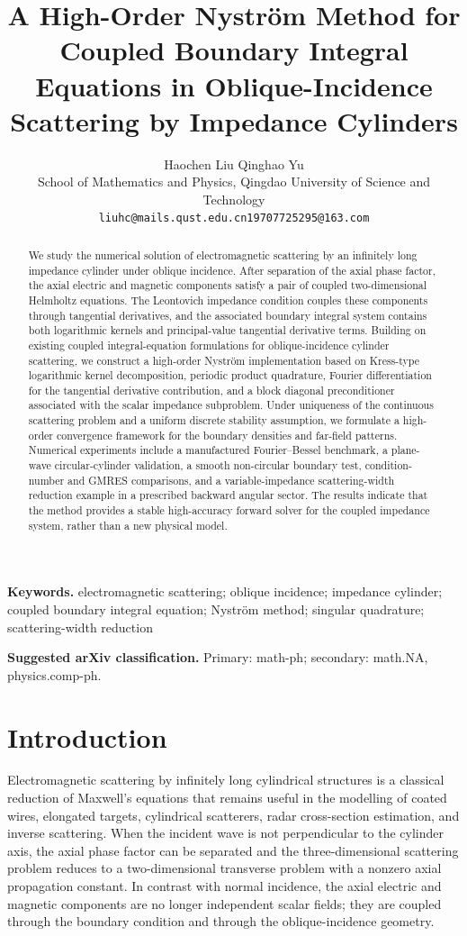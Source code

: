 \documentclass[11pt]{article}
\title{A High-Order Nystr\"om Method for Coupled Boundary Integral Equations in Oblique-Incidence Scattering by Impedance Cylinders}
\author{
Haochen Liu \quad Qinghao Yu\\
School of Mathematics and Physics, Qingdao University of Science and Technology\\
\texttt{liuhc@mails.qust.edu.cn}\quad \texttt{19707725295@163.com}
}
\date{}
\numberwithin{equation}{section}
\begin{document}
\maketitle

\begin{abstract}
We study the numerical solution of electromagnetic scattering by an infinitely long impedance cylinder under oblique incidence. After separation of the axial phase factor, the axial electric and magnetic components satisfy a pair of coupled two-dimensional Helmholtz equations. The Leontovich impedance condition couples these components through tangential derivatives, and the associated boundary integral system contains both logarithmic kernels and principal-value tangential derivative terms. Building on existing coupled integral-equation formulations for oblique-incidence cylinder scattering, we construct a high-order Nystr\"om implementation based on Kress-type logarithmic kernel decomposition, periodic product quadrature, Fourier differentiation for the tangential derivative contribution, and a block diagonal preconditioner associated with the scalar impedance subproblem. Under uniqueness of the continuous scattering problem and a uniform discrete stability assumption, we formulate a high-order convergence framework for the boundary densities and far-field patterns. Numerical experiments include a manufactured Fourier--Bessel benchmark, a plane-wave circular-cylinder validation, a smooth non-circular boundary test, condition-number and GMRES comparisons, and a variable-impedance scattering-width reduction example in a prescribed backward angular sector. The results indicate that the method provides a stable high-accuracy forward solver for the coupled impedance system, rather than a new physical model.
\end{abstract}

\noindent\textbf{Keywords.} electromagnetic scattering; oblique incidence; impedance cylinder; coupled boundary integral equation; Nystr\"om method; singular quadrature; scattering-width reduction

\medskip
\noindent\textbf{Suggested arXiv classification.} Primary: math-ph; secondary: math.NA, physics.comp-ph.

\section{Introduction}

Electromagnetic scattering by infinitely long cylindrical structures is a classical reduction of Maxwell's equations that remains useful in the modelling of coated wires, elongated targets, cylindrical scatterers, radar cross-section estimation, and inverse scattering. When the incident wave is not perpendicular to the cylinder axis, the axial phase factor can be separated and the three-dimensional scattering problem reduces to a two-dimensional transverse problem with a nonzero axial propagation constant. In contrast with normal incidence, the axial electric and magnetic components are no longer independent scalar fields; they are coupled through the boundary condition and through the oblique-incidence geometry.
\end{document}
